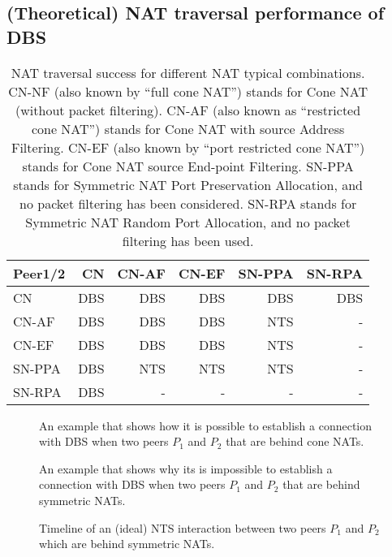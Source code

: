 \subsection{(Theoretical) NAT traversal performance of DBS}

\begin{table}
  \centering
  \begin{tabular}{l|r|r|r|r|r}
    Peer1/2 & CN    & CN-AF & CN-EF & SN-PPA & SN-RPA \\
    \hline
    CN      & DBS   & DBS   & DBS   & DBS    & DBS    \\
    CN-AF   & DBS   & DBS   & DBS   & NTS    & -      \\
    CN-EF   & DBS   & DBS   & DBS   & NTS    & -      \\
    SN-PPA  & DBS   & NTS   & NTS   & NTS    & -      \\
    SN-RPA  & DBS   & -     & -     & -      & -
  \end{tabular}
  \caption{NAT traversal success for different NAT typical
    combinations. CN-NF (also known by ``full cone NAT'') stands for
    Cone NAT (without packet filtering). CN-AF (also known as
    ``restricted cone NAT'') stands for Cone NAT with source Address
    Filtering. CN-EF (also known by ``port restricted cone NAT'')
    stands for Cone NAT source End-point Filtering. SN-PPA stands for
    Symmetric NAT Port Preservation Allocation, and no packet
    filtering has been considered. SN-RPA stands for Symmetric NAT
    Random Port Allocation, and no packet filtering has been used.} %
  \label{tab:theoretical}
\end{table}

\begin{figure}
  \caption{An example that shows how it is possible to establish a
    connection with DBS when two peers $P_1$ and $P_2$ that are behind
    cone NATs.} %
  \label{fig:UDP_Hole_Punching_RCN}
\end{figure}

\begin{figure}
  \caption{An example that shows why its is impossible to establish a
    connection with DBS when two peers $P_1$ and $P_2$ that are behind
    symmetric NATs.} %
  \label{fig:UDP_Hole_Punching_SN_failure}
\end{figure}

\begin{figure*}
  \caption{Timeline of an (ideal) NTS interaction between two peers
    $P_1$ and $P_2$ which are behind symmetric NATs.} %
  \label{fig:SNTuCPP}
\end{figure*}


